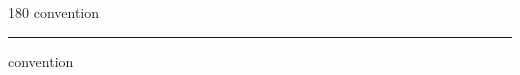 
\begin{frame}
\begin{center}
\begin{turn}{180}
{\fontsize{2.5cm}{1em}\selectfont convention}
\end{turn}
\vspace{1em}\par  
\hrule
\vspace{1em}\par  
{\fontsize{2.5cm}{1em}\selectfont convention}
\end{center}
\end{frame}
